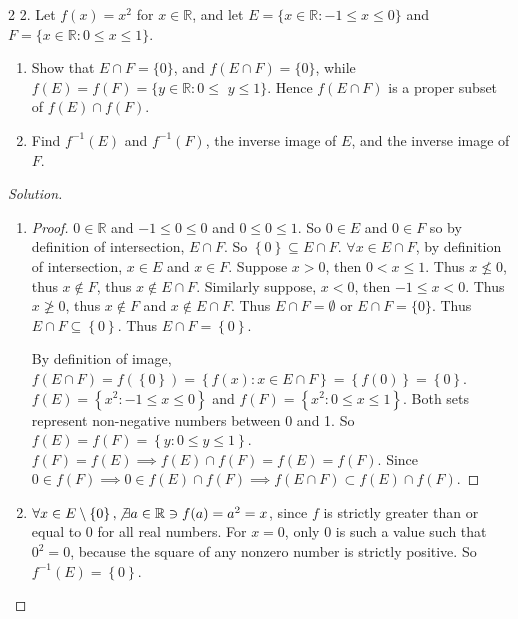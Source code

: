 \documentclass{article}
\newcommand{\R}{\mathbb{R}}
\newenvironment{solution}
{\renewcommand\qedsymbol{$\blacksquare$}\begin{proof}[Solution]}
{\end{proof}}
\begin{document}
\bigskip

\begin{PROB}{2}\label{Problem 2.}
    2. Let $f(x)=x^2$ for $x \in \mathbb{R}$, and let $E=\{x \in \mathbb{R}:-1 \leq x \leq 0\}$ and $F=\{x \in \mathbb{R}: 0 \leq x \leq 1\}$.

    \begin{enumerate}
        \item Show that $E \cap F=\{0\}$, and $f(E \cap F)=\{0\}$, while $f(E)=f(F)=\{y \in \mathbb{R}: 0 \leq$ $y \leq 1\}$. Hence $f(E \cap F)$ is a proper subset of $f(E) \cap f(F)$.
        \item Find $f^{-1}(E)$ and $f^{-1}(F)$, the inverse image of $E$, and the inverse image of $F$.
    \end{enumerate}
\end{PROB}
\begin{solution}
    \begin{enumerate}
        \item \begin{proof}
            $0 \in \R$ and $-1 \leq 0 \leq 0$ and $0 \leq 0 \leq 1$. So $0 \in E$ and $0 \in F$ so by definition of intersection, $E \cap F$. So $\left\{0\right\} \subseteq E \cap F$.      $\forall x \in E \cap F$, by definition of intersection, $x \in E$ and $x \in F$. Suppose $x > 0$, then $0 < x \leq 1$. Thus $x \not \leq 0$, thus $x \not \in F$, thus $x \not \in E \cap F$. Similarly suppose, $x < 0$, then $-1 \leq x < 0$. Thus $x \not \geq 0$, thus $x \not \in F$ and $x \not \in E \cap F$. Thus $E \cap F  = \emptyset$ or $E \cap F = \{0\}$. Thus $E \cap F \subseteq \left\{0\right\}$. Thus $E \cap F = \left\{0\right\}$. 

            By definition of image, $f(E \cap F) = f(\left\{0\right\}) = \left\{f(x) : x \in E \cap F\right\} = \left\{f(0)\right\} = \left\{0\right\}$. $f(E) = \left\{x^2 : -1 \leq x \leq 0 \right\}$ and $f(F) = \left\{ x^2 : 0 \leq x \leq 1 \right\}$. Both sets represent non-negative numbers between 0 and 1. So $f(E) = f(F) = \left\{ y : 0 \leq y \leq 1 \right\}$. $f(F) = f(E) \implies f(E) \cap f(F) = f(E) = f(F)$. Since $0 \in f(F) \implies 0 \in f(E) \cap f(F) \implies f(E \cap F) \subset f(E) \cap f(F)$. 
        \end{proof}

        \item $\forall x \in E \setminus \left\{ 0 \right\}, \not \exists a \in \R \ni f(a) = a^2 = x $, since $f$ is strictly greater than or equal to 0 for all real numbers. For $x = 0$, only 0 is such a value such that $0^2 = 0$, because the square of any nonzero number is strictly positive. So $f^{-1}(E) = \left\{ 0 \right\}$.
        

\end{enumerate}
\end{solution}
\end{document}
